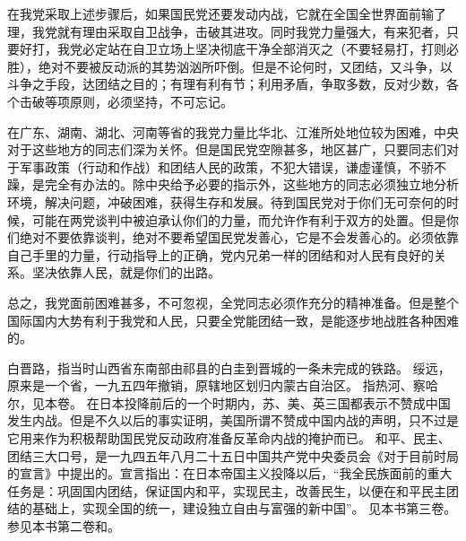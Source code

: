 在我党采取上述步骤后，如果国民党还要发动内战，它就在全国全世界面前输了理，我党就有理由采取自卫战争，击破其进攻。同时我党力量强大，有来犯者，只要好打，我党必定站在自卫立场上坚决彻底干净全部消灭之（不要轻易打，打则必胜），绝对不要被反动派的其势汹汹所吓倒。但是不论何时，又团结，又斗争，以斗争之手段，达团结之目的；有理有利有节；利用矛盾，争取多数，反对少数，各个击破等项原则，必须坚持，不可忘记。

在广东、湖南、湖北、河南等省的我党力量比华北、江淮所处地位较为困难，中央对于这些地方的同志们深为关怀。但是国民党空隙甚多，地区甚广，只要同志们对于军事政策（行动和作战）和团结人民的政策，不犯大错误，谦虚谨慎，不骄不躁，是完全有办法的。除中央给予必要的指示外，这些地方的同志必须独立地分析环境，解决问题，冲破困难，获得生存和发展。待到国民党对于你们无可奈何的时候，可能在两党谈判中被迫承认你们的力量，而允许作有利于双方的处置。但是你们绝对不要依靠谈判，绝对不要希望国民党发善心，它是不会发善心的。必须依靠自己手里的力量，行动指导上的正确，党内兄弟一样的团结和对人民有良好的关系。坚决依靠人民，就是你们的出路。

总之，我党面前困难甚多，不可忽视，全党同志必须作充分的精神准备。但是整个国际国内大势有利于我党和人民，只要全党能团结一致，是能逐步地战胜各种困难的。


\begin{maonote}
白晋路，指当时山西省东南部由祁县的白圭到晋城的一条未完成的铁路。
绥远，原来是一个省，一九五四年撤销，原辖地区划归内蒙古自治区。
指热河、察哈尔，见本卷。
在日本投降前后的一个时期内，苏、美、英三国都表示不赞成中国发生内战。但是不久以后的事实证明，美国所谓不赞成中国内战的声明，只不过是它用来作为积极帮助国民党反动政府准备反革命内战的掩护而已。
和平、民主、团结三大口号，是一九四五年八月二十五日中国共产党中央委员会《对于目前时局的宣言》中提出的。宣言指出：在日本帝国主义投降以后，“我全民族面前的重大任务是：巩固国内团结，保证国内和平，实现民主，改善民生，以便在和平民主团结的基础上，实现全国的统一，建设独立自由与富强的新中国”。
见本书第三卷。
参见本书第二卷和。
\end{maonote}
